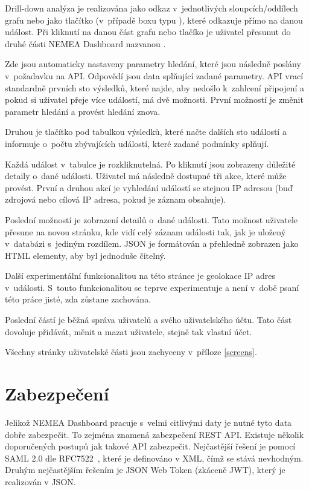 Drill-down analýza je realizována jako odkaz v~jednotlivých sloupcích/oddílech grafu nebo jako tlačítko (v~případě boxu typu ), které odkazuje přímo na danou událost. Při kliknutí na danou část grafu nebo tlačíko je uživatel přesunut do druhé části NEMEA Dashboard nazvanou .

Zde jsou automaticky nastaveny parametry hledání, které jsou následně poslány v~požadavku na API. Odpovědí jsou data splňující zadané parametry. API vrací standardně prvních sto výsledků, které najde, aby nedošlo k~zahlcení připojení a pokud si uživatel přeje více událostí, má dvě možnosti. První možností je změnit parametr hledání a provést hledání znova.

Druhou je tlačítko pod tabulkou výsledků, které načte dalších sto událostí a informuje o~počtu zbývajících událostí, které zadané podmínky splňují.

Každá událost v~tabulce je rozkliknutelná. Po kliknutí jsou zobrazeny důležité detaily o~dané události. Uživatel má následně dostupné tři akce, které může provést. První a druhou akcí je vyhledání událostí se stejnou IP adresou (buď zdrojová nebo cílová IP adresa, pokud je záznam obsahuje).

Poslední možností je zobrazení detailů o~dané události. Tato možnost uživatele přesune na novou stránku, kde vidí celý záznam události tak, jak je uložený v~databázi s~jediným rozdílem. JSON je formátován a přehledně zobrazen jako HTML elementy, aby byl jednoduše čitelný.

Další experimentální funkcionalitou na této stránce je geolokace IP adres v~události. S~touto funkcionalitou se teprve experimentuje a není v~době psaní této práce jisté, zda zůstane zachována.

Poslední částí je běžná správa uživatelů a svého uživatelského účtu. Tato část dovoluje přidávát, měnit a mazat uživatele, stejně tak vlastní účet.

Všechny stránky uživatelské části jsou zachyceny v~příloze \ref{screens}.

\section{Zabezpečení}
\label{zabezpeceni}

Jelikož NEMEA Dashboard pracuje s~velmi citlivými daty je nutné tyto data dobře zabezpečit. To zejména znamená zabezpečení REST API. Existuje několik doporučených postupů jak takové API zabezpečit. Nejčastější řešení je pomocí SAML 2.0 dle RFC7522~\cite{rfc:saml}, které je definováno v XML, čímž se stává nevhodným. Druhým nejčastějším řešením je JSON Web Token (zkáceně JWT), který je realizován v JSON.

